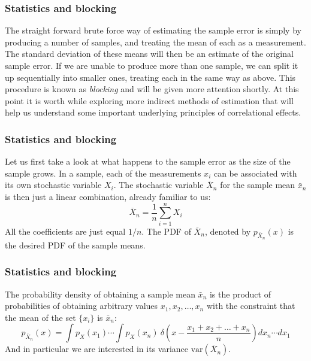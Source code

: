 \documentclass{beamer}
\begin{document}
\begin{frame}
\frametitle{Statistics and blocking}

\begin{block}{}
The straight forward brute force way of estimating the sample error is
simply by producing a number of samples, and treating the mean of each
as a measurement. The standard deviation of these means will then be
an estimate of the original sample error. If we are unable to produce
more than one sample, we can split it up sequentially into smaller
ones, treating each in the same way as above. This procedure is known
as \emph{blocking} and will be given more attention shortly. At this
point it is worth while exploring more indirect methods of estimation
that will help us understand some important underlying principles of
correlational effects.
\end{block}
\end{frame}

\begin{frame}
\frametitle{Statistics and blocking}

\begin{block}{}
Let us first take a look at what happens to the sample error as the
size of the sample grows. In a sample, each of the measurements $x_i$
can be associated with its own stochastic variable $X_i$. The
stochastic variable $\overline X_n$ for the sample mean $\bar{x}_n$ is
then just a linear combination, already familiar to us:
\[
\overline X_n = \frac{1}{n}\sum_{i=1}^n X_i
\]
All the coefficients are just equal $1/n$. The PDF of $\overline X_n$,
denoted by $p_{\overline X_n}(x)$ is the desired PDF of the sample
means. 
\end{block}
\end{frame}

\begin{frame}
\frametitle{Statistics and blocking}

\begin{block}{}
The probability density of obtaining a sample mean $\bar x_n$
is the product of probabilities of obtaining arbitrary values $x_1,
x_2,\dots,x_n$ with the constraint that the mean of the set $\{x_i\}$
is $\bar x_n$:
\[
p_{\overline X_n}(x) = \int p_X^{\phantom X}(x_1)\cdots
\int p_X^{\phantom X}(x_n)\ 
\delta\!\left(x - \frac{x_1+x_2+\dots+x_n}{n}\right)dx_n \cdots dx_1
\]
And in particular we are interested in its variance $\mathrm{var}(\overline X_n)$.
\end{block}
\end{frame}
\end{document}
